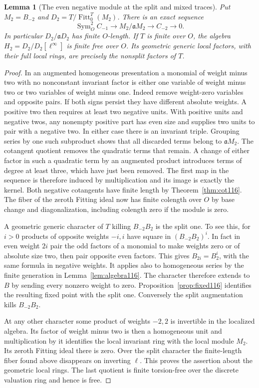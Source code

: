 \documentclass[a4paper,11pt]{article}
\newtheorem{lemma}[proposition]{Lemma}
\theoremstyle{definition}
\theoremstyle{remark}
\numberwithin{equation}{section}
\begin{document}
\begin{lemma}[The even negative module at the split and mixed traces]\leavevmode
\label{lem:evenfiber401}
Put \(M_2=B_{-2}\) and \(D_2=T/\operatorname{Fitt}_0^T(M_2)\).
There is an exact sequence
\[
     \operatorname{Sym}^2_O C_{-1}\longrightarrow
           M_2/\mathfrak aM_2\longrightarrow C_{-2}\longrightarrow0.
\]
In particular \(D_2/\mathfrak a D_2\) has finite \(O\)-length.
If \(T\) is finite over \(O\), the algebra
\(H_2=D_2/D_2[\ell^\infty]\) is finite free over \(O\). Its
geometric generic local factors, with their full local rings,
are precisely the nonsplit factors of \(T\).
\end{lemma}
\begin{proof}
In an augmented homogeneous presentation a monomial of weight
minus two with no nonconstant invariant factor is either one
variable of weight minus two or two variables of weight minus
one. Indeed remove weight-zero variables and opposite pairs.
If both signs persist they have different absolute weights. A
positive two then requires at least two negative units. With
positive units and negative twos, any nonempty positive part
has even size and supplies two units to pair with a negative
two. In either case there is an invariant triple. Grouping series
by one such subproduct shows that all discarded terms belong
to \(\mathfrak aM_2\). The cotangent quotient removes the
quadratic terms that remain. A change of either factor in such
a quadratic term by an augmented product introduces terms of
degree at least three, which have just been removed. The first
map in the sequence is therefore induced by multiplication and
its image is exactly the kernel. Both negative cotangents have
finite length by Theorem~\ref{thm:cot116}. The fiber of the
zeroth Fitting ideal now has finite colength over \(O\) by
base change and diagonalization, including colength zero if
the module is zero.

A geometric generic character of \(T\) killing \(B_{-2}B_2\)
is the split one. To see this, for \(i>0\) products of opposite
weights \(-i,i\) have square in \((B_{-2}B_2)^i\). In fact in
even weight \(2i\) pair the odd factors of a monomial to make
weights zero or of absolute size two, then pair opposite even
factors. This gives \(B_{2i}=B_2^i\), with the same formula in
negative weights. It applies also to homogeneous series by the
finite generation in Lemma~\ref{lem:algebra116}. The character
therefore extends to \(B\) by sending every nonzero weight to
zero. Proposition~\ref{prop:fixed116} identifies the resulting
fixed point with the split one. Conversely the split augmentation
kills \(B_{-2}B_2\).

At any other character some product of weights \(-2,2\) is
invertible in the localized algebra. Its factor of weight minus
two is then a homogeneous unit and multiplication by it
identifies the local invariant ring with the local module
\(M_2\). Its zeroth Fitting ideal there is zero. Over the split
character the finite-length fiber found above disappears on
inverting \(\ell\). This proves the assertion about the geometric
local rings. The last quotient is finite torsion-free over the
discrete valuation ring and hence is free.
\end{proof}
\end{document}
